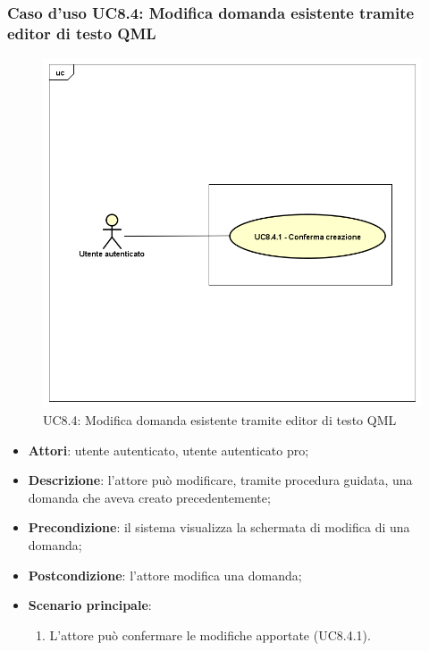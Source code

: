 	\subsubsection{Caso d'uso UC8.4: Modifica domanda esistente tramite editor di testo QML}
	\label{UC8.4}
	\begin{figure}[h]
		\centering
		\includegraphics[scale=0.41,keepaspectratio]{UML/UC8_4.png}
		\caption{UC8.4: Modifica domanda esistente tramite editor di testo QML
			}
	\end{figure}
	\FloatBarrier
	\begin{itemize}
		\item
		\textbf{Attori}: utente autenticato, utente autenticato pro;
		\item		
		\textbf{Descrizione}: l'attore può modificare, tramite procedura guidata, una domanda che aveva creato precedentemente;
		\item
		\textbf{Precondizione}: il sistema visualizza la schermata di modifica di una domanda;
		\item
		\textbf{Postcondizione}: l'attore modifica una domanda;
		\item
		\textbf{Scenario principale}: 
		\begin{enumerate}
			\item
			L'attore può confermare le modifiche apportate (UC8.4.1).
		\end{enumerate}
	\end{itemize}
		
